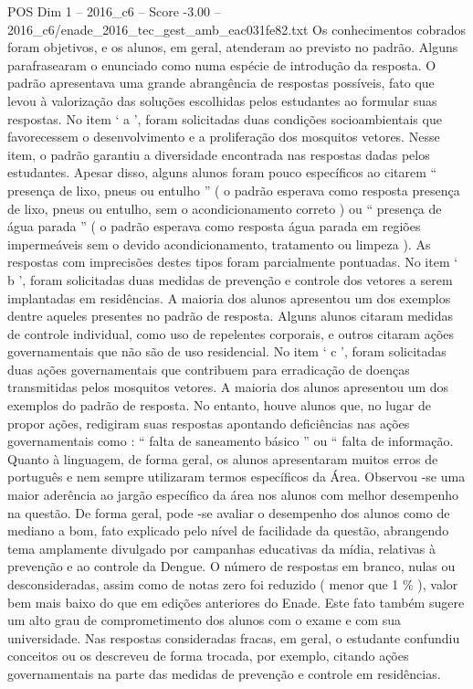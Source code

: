 \begin{textsample}{POS Dim 1 – 2016\_c6 – Score -3.00 – 2016\_c6/enade\_2016\_tec\_gest\_amb\_eac031fe82.txt}
Os conhecimentos cobrados foram objetivos, e os alunos, em geral, atenderam ao previsto no padrão.
Alguns parafrasearam o enunciado como numa espécie de introdução da resposta.
O padrão apresentava uma grande abrangência de respostas possíveis, fato que levou à valorização das soluções escolhidas pelos estudantes ao formular suas respostas.
No item ‘ a ’, foram solicitadas duas condições socioambientais que favorecessem o desenvolvimento e a proliferação dos mosquitos vetores.
Nesse item, o padrão garantiu a diversidade encontrada nas respostas dadas pelos estudantes.
Apesar disso, alguns alunos foram pouco específicos ao citarem “ presença de lixo, pneus ou entulho ” ( o padrão esperava como resposta presença de lixo, pneus ou entulho, sem o acondicionamento correto ) ou “ presença de água parada ” ( o padrão esperava como resposta água parada em regiões impermeáveis sem o devido acondicionamento, tratamento ou limpeza ).
As respostas com imprecisões destes tipos foram parcialmente pontuadas.
No item ‘ b ’, foram solicitadas duas medidas de prevenção e controle dos vetores a serem implantadas em residências.
A maioria dos alunos apresentou um dos exemplos dentre aqueles presentes no padrão de resposta.
Alguns alunos citaram medidas de controle individual, como uso de repelentes corporais, e outros citaram ações governamentais que não são de uso residencial.
No item ‘ c ’, foram solicitadas duas ações governamentais que contribuem para erradicação de doenças transmitidas pelos mosquitos vetores.
A maioria dos alunos apresentou um dos exemplos do padrão de resposta.
No entanto, houve alunos que, no lugar de propor ações, redigiram suas respostas apontando deficiências nas ações governamentais como : “ falta de saneamento básico ” ou “ falta de informação.
Quanto à linguagem, de forma geral, os alunos apresentaram muitos erros de português e nem sempre utilizaram termos específicos da Área.
Observou -se uma maior aderência ao jargão específico da área nos alunos com melhor desempenho na questão.
De forma geral, pode -se avaliar o desempenho dos alunos como de mediano a bom, fato explicado pelo nível de facilidade da questão, abrangendo tema amplamente divulgado por campanhas educativas da mídia, relativas à prevenção e ao controle da Dengue.
O número de respostas em branco, nulas ou desconsideradas, assim como de notas zero foi reduzido ( menor que 1 \% ), valor bem mais baixo do que em edições anteriores do Enade.
Este fato também sugere um alto grau de comprometimento dos alunos com o exame e com sua universidade.
Nas respostas consideradas fracas, em geral, o estudante confundiu conceitos ou os descreveu de forma trocada, por exemplo, citando ações governamentais na parte das medidas de prevenção e controle em residências.

\end{textsample}
